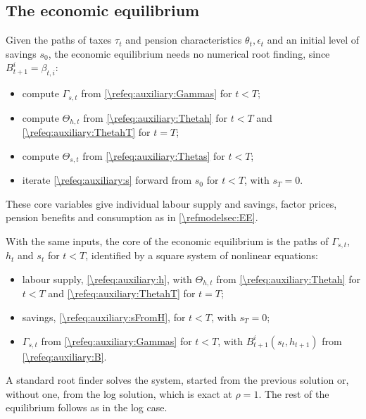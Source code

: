 \subsection{The economic equilibrium}\label{\refsec:EE}

Given the paths of taxes $\tau_t$ and pension characteristics $\theta_t, \epsilon_t$ and an initial level of savings $s_0$, the economic equilibrium needs no numerical root finding, since $B_{t+1}^i = \beta_{t,i}$:
\begin{itemize}
    \item compute $\Gamma_{s,t}$ from \eqref{\refeq:auxiliary:Gammas} for $t<T$;
    \item compute $\Theta_{h,t}$ from \eqref{\refeq:auxiliary:Thetah} for $t<T$ and \eqref{\refeq:auxiliary:ThetahT} for $t=T$;
    \item compute $\Theta_{s,t}$ from \eqref{\refeq:auxiliary:Thetas} for $t<T$;
    \item iterate \eqref{\refeq:auxiliary:s} forward from $s_0$ for $t<T$, with $s_T = 0$.
\end{itemize}
These core variables give individual labour supply and savings, factor prices, pension benefits and consumption as in \cref{\refmodelsec:EE}.


With the same inputs, the core of the economic equilibrium is the paths of $\Gamma_{s,t}$, $h_t$ and $s_t$ for $t<T$, identified by a square system of nonlinear equations:
\begin{itemize}
    \item labour supply, \eqref{\refeq:auxiliary:h}, with $\Theta_{h,t}$ from \eqref{\refeq:auxiliary:Thetah} for $t<T$ and \eqref{\refeq:auxiliary:ThetahT} for $t=T$;
    \item savings, \eqref{\refeq:auxiliary:sFromH}, for $t<T$, with $s_T = 0$;
    \item $\Gamma_{s,t}$ from \eqref{\refeq:auxiliary:Gammas} for $t<T$, with $B_{t+1}^i(s_t, h_{t+1})$ from \eqref{\refeq:auxiliary:B}.
\end{itemize}
A standard root finder solves the system, started from the previous solution or, without one, from the log solution, which is exact at $\rho = 1$. The rest of the equilibrium follows as in the log case.


